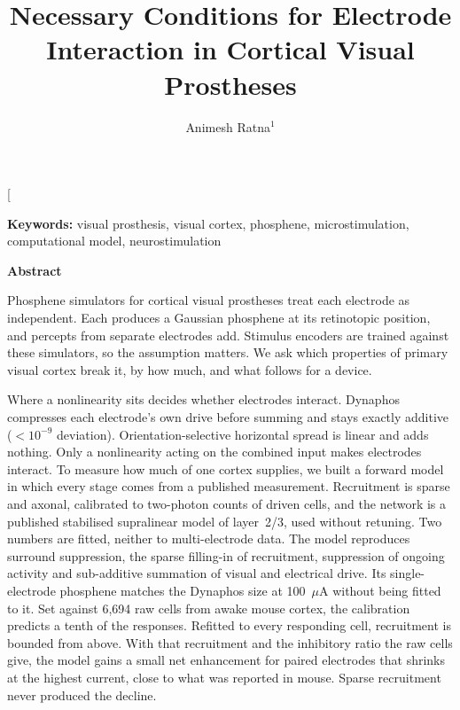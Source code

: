 \documentclass[10pt,twocolumn]{article}
\title{\bfseries Necessary Conditions for Electrode Interaction in
Cortical Visual Prostheses}
\author{\normalsize Animesh Ratna$^{1}$}
\date{}
\newcommand{\uA}{\ensuremath{\mu\text{A}}}
\begin{document}
\twocolumn[
  \begin{@twocolumnfalse}
    \maketitle
    \vspace{-1.2em}

    \begin{center}
    \begin{minipage}{0.92\textwidth}
    \small
    \noindent\textbf{Keywords:} visual prosthesis, visual cortex, phosphene,
    microstimulation, computational model, neurostimulation

    \bigskip
    \begin{center}\textbf{\normalsize Abstract}\end{center}

    \noindent Phosphene simulators for cortical visual prostheses treat each
    electrode as independent. Each produces a Gaussian phosphene at its retinotopic
    position, and percepts from separate electrodes add. Stimulus encoders
    are trained against these simulators, so the assumption matters. We
    ask which properties of primary visual cortex break it, by how much,
    and what follows for a device.

    \smallskip
    \noindent Where a nonlinearity sits decides whether electrodes
    interact. Dynaphos compresses each electrode's own drive before summing
    and stays exactly additive ($<10^{-9}$ deviation). Orientation-selective
    horizontal spread is linear and adds nothing. Only a nonlinearity acting
    on the combined input makes electrodes interact. To measure how much of
    one cortex supplies, we built a forward model in which every stage comes
    from a published measurement. Recruitment is sparse and axonal,
    calibrated to two-photon counts of driven cells, and the network is a
    published stabilised supralinear model of layer~2/3, used without
    retuning. Two numbers are fitted, neither to multi-electrode data. The
    model reproduces surround suppression, the sparse filling-in of
    recruitment, suppression
    of ongoing activity and sub-additive summation of visual and electrical
    drive. Its single-electrode phosphene matches the Dynaphos size at
    100~\uA{} without being fitted to it. Set against 6,694 raw cells from
    awake mouse cortex, the calibration predicts a tenth of the responses.
    Refitted to every responding cell, recruitment is bounded from above.
    With that recruitment and the inhibitory ratio the raw cells give, the
    model gains a small net enhancement for paired electrodes that shrinks
    at the highest current, close to what was reported in mouse. Sparse
    recruitment never produced the decline.


\end{minipage}
\end{center}
\end{@twocolumnfalse}
\end{document}
